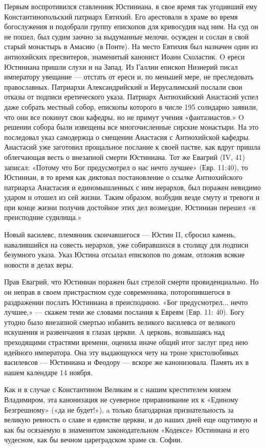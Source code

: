 Первым воспротивился ставленник Юстиниана, в свое время так угодивший ему
Константинопольский патриарх Евтихий. Его арестовали в храме во время
богослужения и подобрали группу епископов для кривосудия над ним. На суд он не
пошел, был судим заочно за выдуманные мелочи, осужден и сослан в свой старый
монастырь в Амасию (в Понте). На место Евтихия был назначен один из
антиохийских пресвитеров, знаменитый канонист Иоанн Схоластик. Ο ереси
Юстиниана пришли слухи и на Запад. Из Галлии епископ Низиерий писал императору
увещание — отстать от ереси и, по меньшей мере, не преследовать православных.
Патриархи Александрийский и Иерусалимский послали свои отказы от подписи
еретического указа. Патриарх Антиохийский Анастасий успел даже собрать местный
собор, епископы которого в числе 195 солидарно заявили, что они все покинут
свои кафедры, но не примут учения «фантазиастов.» Ο решении собора были
извещены все многочисленные сирские монастыри. На это последовал указ
самодержца ο смещении Анастасия с Антиохийской кафедры. Анастасий уже заготовил
прощальное послание к своей пастве, как вдруг пришла облегчающая весть ο
внезапной смерти Юстиниана. Тот же Евагрий (IV, 41) записал: «Потому что Бог
предусмотрел ο нас нечто лучшее» (Евр. 11:40), то Юстиниан, в то время как
диктовал постановление ο ссылке Антиохийского патриарха Анастасия и
единомышленных с ним иерархов, был поражен невидимо ударом и отошел из сей
жизни. Таким образом, возбудив везде смуту и тревоги и при конце жизни получив
достойное этих дел возмездие, Юстиниан перешел «в преисподние судилища.»

Новый василевс, племянник скончавшегося — Юстин II, сбросил камень,
навалившийся на совесть иерархов, уже собиравшихся в столицу для подписи
безумного указа. Указ Юстина отсылал епископов по домам, отложив всякие новости
в делах веры.

Прав Евагрий, что Юстиниан поражен был стрелой смерти провиденциально. Но он
неправ в своем пристрастном суде современника, поторопившегося в раздражении
послать Юстиниана в преисподнюю. «Бог предусмотрел... нечто лучшее,» — скажем
теми же словами послания к Евреям (Евр. 11: 40). Богу утодно было внезапной
смертью избавить великого василевса от великого искушения и развенчания в
глазах церкви. A церковь, возвышаясь над преходящими страстями времени, оценила
иначе общий итог заслуг пред нею идейного императора. Она эту выдающуюся чету
на троне христолюбивых василевсов — Юстиниана и Феодору — вскоре же
канонизовала. Память их в нашем календаре 14 ноября.

Как и в случае с Константином Великим и с нашим крестителем князем Владимиром,
эта канонизация не суеверное приравнивание их к «Единому Безгрешному» («да не
будет!»), a только благодарная признательность за великую ревность ο славе и
единстве церкви, и до наших дней еще ощутимую и как бы осязаемую в знаменитом
законодательном «Кодексе» Юстиниана и его чудесном, как бы вечном цареградском
храме св. Софии.
  
